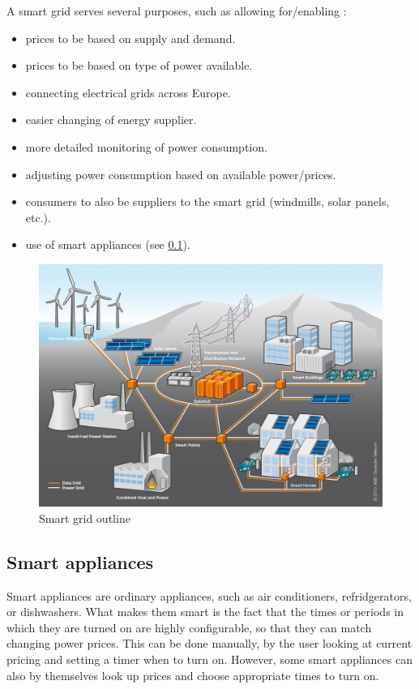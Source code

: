 A smart grid serves several purposes, such as allowing for/enabling \cite{smartgrid_gov, directive_2009_72_EC}:
\begin{itemize}
	\item prices to be based on supply and demand.
	\item prices to be based on type of power available.
	\item connecting electrical grids across Europe.
	\item easier changing of energy supplier.
	\item more detailed monitoring of power consumption.
	\item adjusting power consumption based on available power/prices.
	\item consumers to also be suppliers to the smart grid (windmills, solar panels, etc.).
	\item use of smart appliances (see \cref{background:smart_appliances}).
\end{itemize}

\begin{figure}
	\includegraphics[width=\textwidth]{figures/SmartGrid_Ueberblick_ohneLegende.jpg}
	\caption{Smart grid outline\protect\footnotemark}
	\label{fig:background:smartgrid}
\end{figure}

\subsection{Smart appliances}
\label{background:smart_appliances}
Smart appliances\cite{smart_appliances} are ordinary appliances, such as air conditioners, refridgerators, or dishwashers.
What makes them smart is the fact that the times or periods in which they are turned on are highly configurable, so that they can match changing power prices.
This can be done manually, by the user looking at current pricing and setting a timer when to turn on.
However, some smart appliances can also by themselves look up prices and choose appropriate times to turn on.

